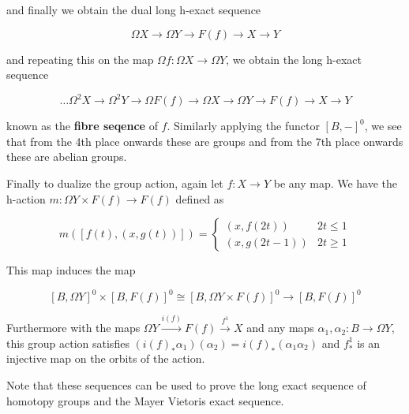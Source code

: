 and finally we obtain the dual long h-exact sequence

\[\Omega X\to\Omega Y\to F(f)\to X\to Y\]

and repeating this on the map $\Omega f:\Omega X\to\Omega Y$, we obtain the long h-exact sequence

\[\dots\Omega^2X\to\Omega^2Y\to\Omega F(f)\to\Omega X\to\Omega Y\to F(f)\to X\to Y\]

known as the \textbf{fibre seqence} of $f$. Similarly applying the functor $\left[B,-\right]^0$, we see that from the 4th place onwards these are groups and from the 7th place onwards these are abelian groups.

Finally to dualize the group action, again let $f:X\to Y$ be any map. We have the h-action $m:\Omega Y\times F(f)\to F(f)$ defined as

\[m\left(\left[f(t),\left(x,g(t)\right)\right]\right)=\begin{cases}\left(x,f(2t)\right)&2t\leq1\\\left(x,g(2t-1)\right)&2t\geq1\end{cases}\]

This map induces the map

\[\left[B,\Omega Y\right]^0\times\left[B,F(f)\right]^0\cong\left[B,\Omega Y\times F(f)\right]^0\to\left[B,F(f)\right]^0\]

Furthermore with the maps $\Omega Y\overset{i(f)}\to F(f)\overset{f^1}\to X$ and any maps $\alpha_1,\alpha_2:B\to\Omega Y$, this group action satisfies $\left(i(f)_*\alpha_1\right)\left(\alpha_2\right)=i(f)_*\left(\alpha_1\alpha_2\right)$ and $f^1_*$ is an injective map on the orbits of the action.

Note that these sequences can be used to prove the long exact sequence of homotopy groups and the Mayer Vietoris exact sequence.
